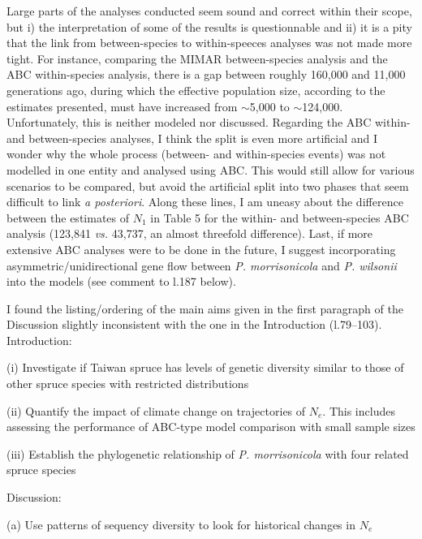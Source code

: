 \documentclass[11pt]{article}
\newenvironment{my_enumerate}
{\begin{enumerate}
  \setlength{\itemsep}{2pt}
  \setlength{\parskip}{0pt}
  \setlength{\parsep}{0pt}}
{\end{enumerate}}
\begin{document}
\begin{my_enumerate}
	\item Large parts of the analyses conducted seem sound and correct within their scope, but i) the interpretation of some of the results is questionnable and ii) it is a pity that the link from between-species to within-speeces analyses was not made more tight. For instance, comparing the MIMAR between-species analysis and the ABC within-species analysis, there is a gap between roughly 160,000 and 11,000 generations ago, during which the effective population size, according to the estimates presented, must have increased from $\sim$5,000 to $\sim$124,000. Unfortunately, this is neither modeled nor discussed. Regarding the ABC within- and between-species analyses, I think the split is even more artificial and I wonder why the whole process (between- and within-species events) was not modelled in one entity and analysed using ABC. This would still allow for various scenarios to be compared, but avoid the artificial split into two phases that seem difficult to link \emph{a posteriori}. Along these lines, I am uneasy about the difference between the estimates of $N_1$ in Table 5 for the within- and between-species ABC analysis (123,841 \emph{vs.} 43,737, an almost threefold difference). Last, if more extensive ABC analyses were to be done in the future, I suggest incorporating asymmetric/unidirectional gene flow between \emph{P. morrisonicola} and \emph{P. wilsonii} into the models (see comment to l.187 below).
	\item I found the listing/ordering of the main aims given in the first paragraph of the Discussion slightly inconsistent with the one in the Introduction (l.79--103).\\
	Introduction:
	\begin{my_enumerate}
		\item[(i)] Investigate if Taiwan spruce has levels of genetic diversity similar to those of other spruce species with restricted distributions
		\item[(ii)] Quantify the impact of climate change on trajectories of $N_e$. This includes assessing the performance of ABC-type model comparison with small sample sizes
		\item[(iii)] Establish the phylogenetic relationship of \emph{P. morrisonicola} with four related spruce species
	\end{my_enumerate} 
	Discussion:
	\begin{my_enumerate}
		\item[(a)] Use patterns of sequency diversity to look for historical changes in $N_e$

\end{my_enumerate}
\end{my_enumerate}
\end{document}
